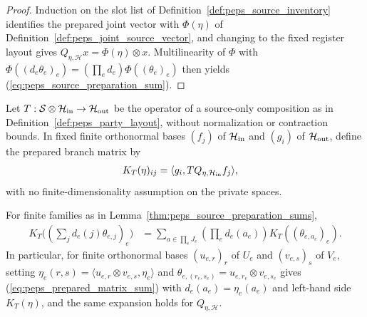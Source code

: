 \begin{proof}\leanok
    Induction on the slot list of Definition~\ref{def:peps_source_inventory}
    identifies the prepared joint vector with $\Phi(\eta)$ of
    Definition~\ref{def:peps_joint_source_vector}, and changing to the fixed
    register layout gives $Q_{\eta,\mathcal H}x=\Phi(\eta)\otimes x$.
    Multilinearity of $\Phi$ with
    $\Phi((d_e\theta_e)_e)=(\prod_e d_e)\Phi((\theta_e)_e)$ then yields
    (\ref{eq:peps_source_preparation_sum}).
\end{proof}

\begin{definition}
    \label{def:peps_prepared_matrix}
    \leanok
    Let $T:\mathcal S\otimes\mathcal H_{\rm in}\to\mathcal H_{\rm out}$ be the
    operator of a source-only composition as in
    Definition~\ref{def:peps_party_layout}, without normalization or
    contraction bounds. In fixed finite orthonormal bases $(f_j)$ of
    $\mathcal H_{\rm in}$ and $(g_i)$ of $\mathcal H_{\rm out}$, define the
    prepared branch matrix by
    \begin{align}
        K_T(\eta)_{ij}
         & =\langle g_i,TQ_{\eta,\mathcal H_{\rm in}}f_j\rangle,
        \label{eq:peps_prepared_matrix}
    \end{align}
    with no finite-dimensionality assumption on the private spaces.
\end{definition}

\begin{lemma}
    \label{thm:peps_prepared_matrix_coordinates}
    \leanok
    For finite families as in Lemma~\ref{thm:peps_source_preparation_sums},
    \begin{align}
        K_T\bigl((\sum_j d_e(j)\theta_{e,j})_e\bigr)
         & =\sum_{a\in\prod_e J_e}
        \left(\prod_e d_e(a_e)\right)K_T((\theta_{e,a_e})_e).
        \label{eq:peps_prepared_matrix_sum}
    \end{align}
    In particular, for finite orthonormal bases $(u_{e,r})_r$ of $U_e$ and
    $(v_{e,s})_s$ of $V_e$, setting
    $\eta_e(r,s)=\langle u_{e,r}\otimes v_{e,s},\eta_e\rangle$ and
    $\theta_{e,(r_e,s_e)}=u_{e,r_e}\otimes v_{e,s_e}$ gives
    (\ref{eq:peps_prepared_matrix_sum}) with $d_e(a_e)=\eta_e(a_e)$ and
    left-hand side $K_T(\eta)$, and the same expansion holds for
    $Q_{\eta,\mathcal H}$.
\end{lemma}

